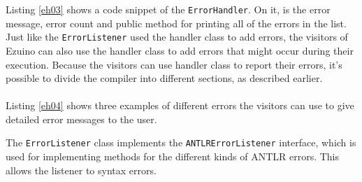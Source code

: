 Listing \ref{eh03} shows a code snippet of the \texttt{ErrorHandler}. On it, is the error message, error count and public method for printing all of the errors in the list.\\

\noindent\newline
Just like the \texttt{ErrorListener} used the handler class to add errors, the visitors of Ezuino can also use the handler class to add errors that might occur during their execution. Because the visitors can use handler class to report their errors, it's possible to divide the compiler into different sections, as described earlier.
\\\\



Listing \ref{eh04} shows three examples of different errors the visitors can use to give detailed error messages to the user.

\noindent\newline




The \texttt{ErrorListener} class implements the \texttt{ANTLRErrorListener} interface, which is used for implementing methods for the different kinds of ANTLR errors. This allows the listener to syntax errors.

